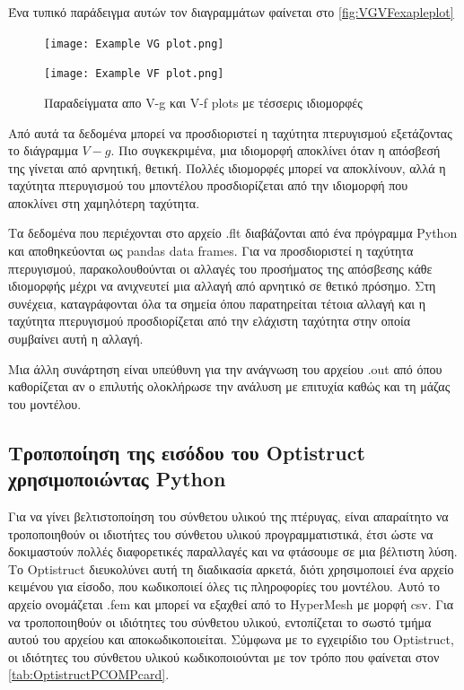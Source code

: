 Ένα τυπικό παράδειγμα αυτών τον διαγραμμάτων φαίνεται στο \autoref{fig:VGVFexapleplot} 

\begin{figure}[H]
  \centering
  \begin{minipage}{0.495\textwidth}
      \centering
      \texttt{[image: Example VG plot.png]}
  \end{minipage}
  \hfill
  \begin{minipage}{0.495\textwidth}
      \centering
      \texttt{[image: Example VF plot.png]}

  \end{minipage}
  \caption{Παραδείγματα απο \textlatin{V-g}  και \textlatin{V-f plots} με τέσσερις ιδιομορφές \cite{altair_flutter_tips}}
  \label{fig:VGVFexapleplot}
\end{figure}


Από αυτά τα δεδομένα μπορεί να προσδιοριστεί η ταχύτητα πτερυγισμού εξετάζοντας το διάγραμμα $V-g$. Πιο συγκεκριμένα, μια ιδιομορφή αποκλίνει όταν η απόσβεσή της γίνεται από αρνητική, θετική. Πολλές ιδιομορφές μπορεί να αποκλίνουν, αλλά η ταχύτητα πτερυγισμού του μποντέλου προσδιορίζεται από την ιδιομορφή που αποκλίνει στη χαμηλότερη ταχύτητα.

Τα δεδομένα που περιέχονται στο αρχείο \textlatin{.flt} διαβάζονται από ένα πρόγραμμα \textlatin{Python} και αποθηκεύονται ως \textlatin{pandas data frames}. Για να προσδιοριστεί η ταχύτητα πτερυγισμού, παρακολουθούνται οι αλλαγές του προσήματος της απόσβεσης κάθε ιδιομορφής μέχρι να ανιχνευτεί μια αλλαγή από αρνητικό σε θετικό πρόσημο. Στη συνέχεια, καταγράφονται όλα τα σημεία όπου παρατηρείται τέτοια αλλαγή και η ταχύτητα πτερυγισμού προσδιορίζεται από την ελάχιστη ταχύτητα στην οποία συμβαίνει αυτή η αλλαγή.

Μια άλλη συνάρτηση είναι υπεύθυνη για την ανάγνωση του αρχείου \textlatin{.out} από όπου καθορίζεται αν ο επιλυτής ολοκλήρωσε την ανάλυση με επιτυχία καθώς και τη μάζας του μοντέλου.

\subsection{Τροποποίηση της εισόδου του \textlatin{Optistruct} χρησιμοποιώντας \textlatin{Python}}
\label{modifying-optistructs-input-using-python}

Για να γίνει βελτιστοποίηση του σύνθετου υλικού της πτέρυγας, είναι απαραίτητο να τροποποιηθούν οι ιδιοτήτες του σύνθετου υλικού προγραμματιστικά, έτσι ώστε να δοκιμαστούν πολλές διαφορετικές παραλλαγές και να φτάσουμε σε μια βέλτιστη λύση. Το \textlatin{Optistruct} διευκολύνει αυτή τη διαδικασία αρκετά, διότι χρησιμοποιεί ένα αρχείο κειμένου για είσοδο, που κωδικοποιεί όλες τις πληροφορίες του μοντέλου. Αυτό το αρχείο ονομάζεται \textlatin{.fem} και μπορεί να εξαχθεί από το \textlatin{HyperMesh} με μορφή \textlatin{csv}. Για να τροποποιηθούν οι ιδιότητες του σύνθετου υλικού, εντοπίζεται το σωστό τμήμα αυτού του αρχείου και αποκωδικοποιείται. Σύμφωνα με το εγχειρίδιο του \textlatin{Optistruct}, οι ιδιότητες του σύνθετου υλικού κωδικοποιούνται με τον τρόπο που φαίνεται στον \autoref{tab:OptistructPCOMPcard}.


